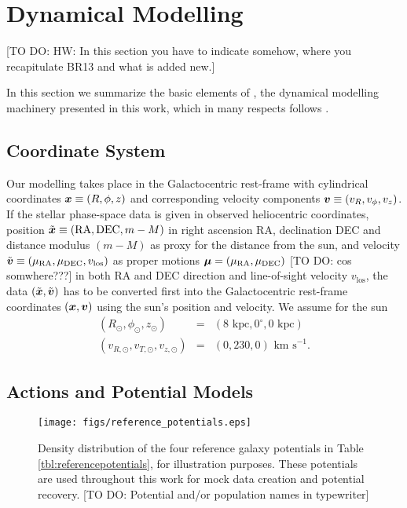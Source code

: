\section{Dynamical Modelling}

[TO DO: HW: In this section you have to indicate somehow, where you recapitulate BR13 and what is added new.]

In this section we summarize the basic elements of \RM{}, the dynamical modelling machinery presented in this work, which in many respects follows \citet{bov13}.

\subsection{Coordinate System} \label{sec:coordinates}

Our modelling takes place in the Galactocentric rest-frame with cylindrical coordinates $\boldsymbol{x} \equiv (R,\phi,z)$ and corresponding velocity components $\boldsymbol{v} \equiv (v_R,v_\phi,v_z)$. If the stellar phase-space data is given in observed heliocentric coordinates, position $\tilde{\boldsymbol{x}} \equiv(\text{RA},\text{DEC},m-M)$ in right ascension RA, declination DEC and distance modulus $(m-M)$ as proxy for the distance from the sun, and velocity $\tilde{\boldsymbol{v}} \equiv (\mu_\text{RA},\mu_\text{DEC},v_\text{los})$ as proper motions $\boldsymbol{\mu}=(\mu_\text{RA},\mu_\text{DEC})$ [TO DO: cos somwhere???] in both RA and DEC direction and line-of-sight velocity $v_\text{los}$, the data $(\tilde{\boldsymbol{x}},\tilde{\boldsymbol{v}})$ has to be converted first into the Galactocentric rest-frame coordinates $(\boldsymbol{x},\boldsymbol{v})$ using the sun's position and velocity. We assume for the sun
\begin{eqnarray*}
(R_\odot,\phi_\odot,z_\odot) &=&(8 \text{ kpc}, 0^\circ, 0 \text{ kpc})\\
(v_{R,\odot},v_{T,\odot},v_{z,\odot}) &=& (0,230,0) \text{ km s}^{-1}.
\end{eqnarray*}

\subsection{Actions and Potential Models}  \label{sec:potentials}



\begin{figure*}
\texttt{[image: figs/reference\_potentials.eps]}
\caption{Density distribution of the four reference galaxy potentials in Table \ref{tbl:referencepotentials}, for illustration purposes. These potentials are used throughout this work for mock data creation and potential recovery. [TO DO: Potential and/or population names in typewriter]}
\label{fig:ref_pots}
\end{figure*}

